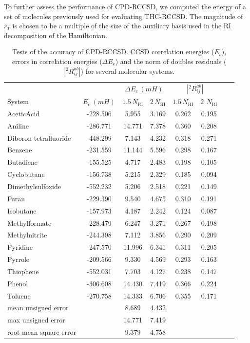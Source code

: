 To further assess the performance of CPD-RCCSD, we computed the energy 
of a set of molecules previously used for evaluating THC-RCCSD. The magnitude 
of $r_{T}$ is chosen to be a multiple of the size of the auxiliary basis used 
in the RI decomposition of the Hamiltonian.
%
\begin{center}
\begin{table}[!ht]
\caption{Tests of the accuracy of CPD-RCCSD. CCSD correlation energies ($E_c$), 
errors in correlation energies ($\Delta E_c$)
and the norm of doubles residuals ($|{}^2R_{ij}^{ab}|$) for several molecular 
systems.
\label{tab:energies_cpd_rccsd}}
\begin{tabular}{lccccccc}
\hline \hline
& & \multicolumn{2}{c}{$\Delta E_c~(mH)$} & 
\multicolumn{2}{c}{$|{}^2R_{ij}^{ab}|$}\\
\cline{3-4} \cline{5-6} System & $E_c~(mH)$ & $1.5 \, N_\mathrm{RI}$ &
$2 \, N_\mathrm{RI}$ & $1.5 \, N_\mathrm{RI}$ &
$2 \,~N_\mathrm{RI}$\\
\hline
AceticAcid & -228.506 & 5.955 & 3.169 & 0.262 & 0.195 \\
Aniline & -286.771 & 14.771 & 7.378 & 0.360 & 0.208 \\
Diboron tetrafluoride & -448.299 & 7.143 & 4.232 & 0.318 & 0.271 \\
Benzene & -231.559 & 11.144 & 5.596 & 0.298 & 0.167 \\
Butadiene & -155.525  & 4.717 & 2.483 & 0.198 & 0.105 \\
Cyclobutane & -156.738  & 5.215 & 2.329 & 0.185 & 0.094 \\
Dimethylsulfoxide & -552.232  & 5.206 & 2.518 & 0.221 & 0.149 \\
Furan & -229.390 & 9.540 & 4.675 & 0.310 & 0.191 \\
Isobutane & -157.973 & 4.187 & 2.242 & 0.124 & 0.087 \\
Methylformate & -228.479 & 6.247 & 3.271 & 0.267 & 0.198 \\
Methylnitrite & -244.398 & 7.112 & 3.856 & 0.290 & 0.209 \\
Pyridine & -247.570 & 11.996 & 6.341 & 0.311 & 0.205 \\
Pyrrole & -209.566 & 9.330 & 4.569 & 0.293 & 0.163 \\
Thiophene & -552.031 & 7.703 & 4.127 & 0.238 & 0.147 \\
Phenol & -306.608 & 14.430 & 7.419 & 0.366 & 0.224 \\
Toluene & -270.758 & 14.333 & 6.706 & 0.355 & 0.171 \\
mean unsigned error & & 8.689 & 4.432 & & &\\
max unsigned error & & 14.771 & 7.419 & & &\\
root-mean-square error& & 9.379 & 4.758 & & &\\
\hline\hline
\end{tabular}
\end{table}
\end{center}
